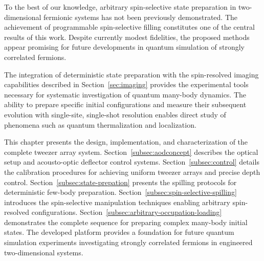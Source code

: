 To the best of our knowledge, arbitrary spin-selective state preparation in two-dimensional fermionic systems has not been previously demonstrated. 
The achievement of programmable spin-selective filling constitutes one of the central results of this work. Despite currently modest fidelities, the proposed methods appear promising for future developments in quantum simulation of strongly correlated fermions.

The integration of deterministic state preparation with the spin-resolved imaging capabilities described in Section~\ref{sec:imaging} provides the experimental tools necessary for systematic investigation of quantum many-body dynamics. The ability to prepare specific initial configurations and measure their subsequent evolution with single-site, single-shot resolution enables direct study of phenomena such as quantum thermalization and localization. 

This chapter presents the design, implementation, and characterization of the complete tweezer array system. Section~\ref{subsec:aodconcept} describes the optical setup and acousto-optic deflector control systems. Section~\ref{subsec:control} details the calibration procedures for achieving uniform tweezer arrays and precise depth control. Section~\ref{subsec:state-prepation} presents the spilling protocols for deterministic few-body preparation. Section~\ref{subsec:spin-selective-spilling} introduces the spin-selective manipulation techniques enabling arbitrary spin-resolved configurations. Section~\ref{subsec:arbitrary-occupation-loading} demonstrates the complete sequence for preparing complex many-body initial states. The developed platform provides a foundation for future quantum simulation experiments investigating strongly correlated fermions in engineered two-dimensional systems.